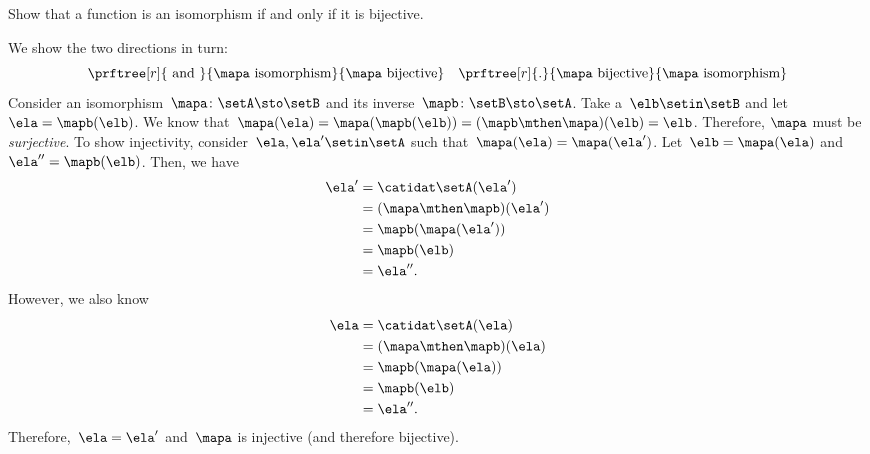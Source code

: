 \begin{exercise}
    \label{ex:bijective-functions-are-isomorphisms}
    Show that a function is an isomorphism if and only if it is bijective.
\end{exercise}
\begin{solution}
    We show the two directions in turn:
    \begin{equation}
        \prftree[r]{\text{ and }}{\mapa \text{ isomorphism}}{\mapa \text{ bijective}} \quad \prftree[r]{.
        }{\mapa \text{ bijective}}{\mapa \text{ isomorphism}}
    \end{equation}
    Consider an isomorphism~$\mapa\colon \setA \sto \setB$ and its inverse~$\mapb\colon \setB \sto \setA$.
    Take a~$\elb\setin\setB$ and let~$\ela= \mapb(\elb)$.
    We know that~$\mapa(\ela)=\mapa(\mapb(\elb))=(\mapb\mthen \mapa)(\elb)=\elb$.
    Therefore, $\mapa$ must be \emph{surjective}.
    To show injectivity, consider~$\ela,\ela'\setin\setA$ such that~$\mapa(\ela)=\mapa(\ela')$.
    Let~$\elb=\mapa(\ela)$ and~$\ela''=\mapb(\elb)$.
    Then, we have
    \begin{equation}
        \begin{aligned}
            \ela' & =\catidat\setA(\ela') \\
                  & =(\mapa \mthen \mapb)(\ela') \\
                  & =\mapb(\mapa(\ela')) \\
                  & =\mapb(\elb) \\
                  & =\ela''.
        \end{aligned}
    \end{equation}
    However, we also know
    \begin{equation}
        \begin{aligned}
            \ela & =\catidat\setA(\ela) \\
                 & =(\mapa \mthen \mapb)(\ela) \\
                 & =\mapb(\mapa(\ela)) \\
                 & =\mapb(\elb) \\
                 & =\ela''.
        \end{aligned}
    \end{equation}
    Therefore,~$\ela=\ela'$ and~$\mapa$ is injective (and therefore bijective).


\end{solution}
